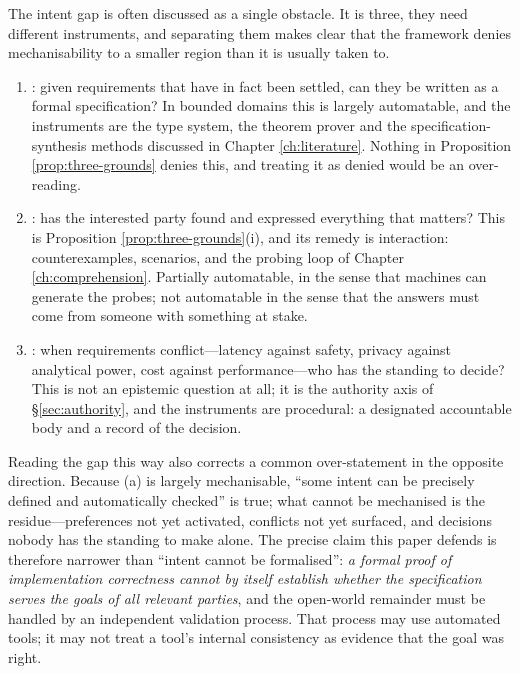 \begin{remark}\label{rmk:three-questions}
The intent gap is often discussed as a single obstacle. It is three, they need different
instruments, and separating them makes clear that the framework denies mechanisability to a smaller
region than it is usually taken to.

\begin{enumerate}[label=(\alph*)]
\item {}: given requirements that have in fact been settled, can they be
      written as a formal specification? In bounded domains this is largely automatable, and the
      instruments are the type system, the theorem prover and the specification-synthesis methods
      discussed in Chapter \ref{ch:literature}. Nothing in Proposition \ref{prop:three-grounds}
      denies this, and treating it as denied would be an over-reading.
\item {}: has the interested party found and expressed everything that
      matters? This is Proposition \ref{prop:three-grounds}(i), and its remedy is interaction:
      counterexamples, scenarios, and the probing loop of Chapter \ref{ch:comprehension}. Partially
      automatable, in the sense that machines can generate the probes; not automatable in the sense
      that the answers must come from someone with something at stake.
\item {}: when requirements conflict---latency against safety, privacy against
      analytical power, cost against performance---who has the standing to decide? This is not an
      epistemic question at all; it is the authority axis of \S\ref{sec:authority}, and the
      instruments are procedural: a designated accountable body and a record of the decision.
\end{enumerate}
Reading the gap this way also corrects a common over-statement in the opposite direction. Because
(a) is largely mechanisable, ``some intent can be precisely defined and automatically checked'' is
true; what cannot be mechanised is the residue---preferences not yet activated, conflicts not yet
surfaced, and decisions nobody has the standing to make alone. The precise claim this paper defends
is therefore narrower than ``intent cannot be formalised'': \emph{a formal proof of implementation
correctness cannot by itself establish whether the specification serves the goals of all relevant
parties}, and the open-world remainder must be handled by an independent validation process. That
process may use automated tools; it may not treat a tool's internal consistency as evidence that the
goal was right.
\end{remark}


